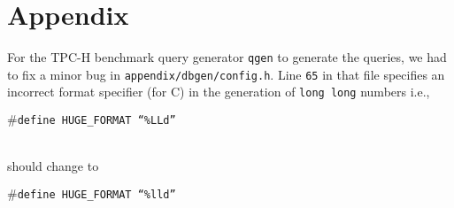 \appendix
\section{Appendix}
\label{sec:appendix}
For the TPC-H benchmark query generator \texttt{qgen} to generate the queries, we had to fix a minor bug in \texttt{appendix/dbgen/config.h}. Line \texttt{65} in that file specifies an incorrect format specifier (for C) in the generation of \texttt{long long} numbers i.e.,\\
\centerline{\texttt{$\#$define HUGE\_FORMAT ``\%LLd''}}\\
\noindent should change to\\
\centerline{\texttt{$\#$define HUGE\_FORMAT ``\%lld''}}
